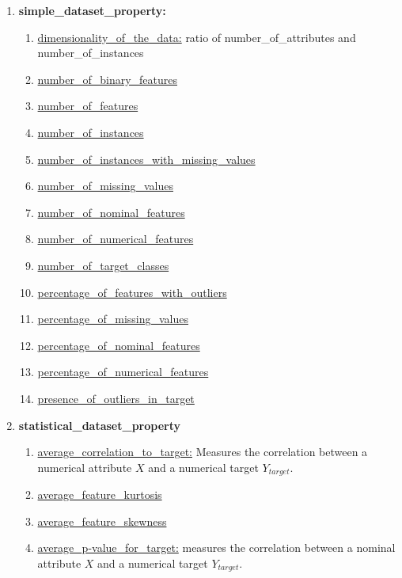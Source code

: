\documentclass[a4paper,12pt, english]{article}
\begin{document}
\begin{enumerate}
\begin{enumerate}
\begin{enumerate}
			\item \textbf{simple\_dataset\_property:}
				\begin{enumerate}
				\item \underline{dimensionality\_of\_the\_data:} ratio of number\_of\_attributes and number\_of\_instances
				\item \underline{number\_of\_binary\_features}
				\item \underline{number\_of\_features}
				\item \underline{number\_of\_instances}
				\item \underline{number\_of\_instances\_with\_missing\_values}
				\item \underline{number\_of\_missing\_values}
				\item \underline{number\_of\_nominal\_features}
				\item \underline{number\_of\_numerical\_features}
				\item \underline{number\_of\_target\_classes}
				\item \underline{percentage\_of\_features\_with\_outliers}
				\item \underline{percentage\_of\_missing\_values}
				\item \underline{percentage\_of\_nominal\_features}
				\item \underline{percentage\_of\_numerical\_features}
				\item \underline{presence\_of\_outliers\_in\_target}
				\end{enumerate}			
			\item \textbf{statistical\_dataset\_property}
				\begin{enumerate}
				\item \underline{average\_correlation\_to\_target:} Measures the correlation between a numerical attribute $X$ and a numerical target $Y_{target}$.
				\item \underline{average\_feature\_kurtosis}
				\item \underline{average\_feature\_skewness}
				\item \underline{average\_p-value\_for\_target:} measures the correlation between a nominal attribute $X$ and a numerical target $Y_{target}$.

\end{enumerate}
\end{enumerate}
\end{enumerate}
\end{enumerate}
\end{document}
